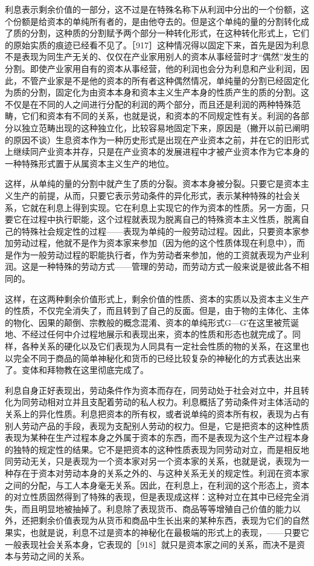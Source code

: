 利息表示剩余价值的一部分，这不过是在特殊名称下从利润中分出的一个份额，这个份额是给资本的单纯所有者的，是由他夺去的。但是这个单纯的量的分割转化成了质的分割，这种质的分割赋予两个部分一种转化形式，在这种转化形式上，它们的原始实质的痕迹已经看不见了。［917］这种情况得以固定下来，首先是因为利息不是表现为同生产无关的、仅仅在产业家用别人的资本从事经营时才“偶然”发生的分割。即使产业家用自有的资本从事经营，他的利润也会分为利息和产业利润，因此，不管产业家是不是他的资本的所有者这种偶然情况，单纯量的分割已经固定化为质的分割，固定化为由资本本身和资本主义生产本身的性质产生的质的分割。这不仅是在不同的人之间进行分配的利润的两个部分，而且还是利润的两种特殊范畴，它们和资本有不同的关系，也就是说，和资本的不同规定性有关。利润的各部分以独立范畴出现的这种独立化，比较容易地固定下来，原因是（撇开以前已阐明的原因不谈）生息资本作为一种历史形式是出现在产业资本之前，并在它的旧形式上继续同产业资本并存，只是在产业资本的发展进程中才被产业资本作为它本身的一种特殊形式置于从属资本主义生产的地位。

这样，从单纯的量的分割中就产生了质的分裂。资本本身被分裂。只要它是资本主义生产的前提，从而，只要它表示劳动条件的异化形式，表示某种特殊的社会关系，它就在利息上得到实现。它在利息上实现它的作为资本的性质。另一方面，只要它在过程中执行职能，这个过程就表现为脱离自己的特殊资本主义性质，脱离自己的特殊社会规定性的过程——表现为单纯的一般劳动过程。因此，只要资本家参加劳动过程，他就不是作为资本家来参加（因为他的这个性质体现在利息中），而是作为一般劳动过程的职能执行者，作为劳动者来参加，他的工资就表现为产业利润。这是一种特殊的劳动方式——管理的劳动，而劳动方式一般来说是彼此各不相同的。

这样，在这两种剩余价值形式上，剩余价值的性质、资本的实质以及资本主义生产的性质，不仅完全消失了，而且转到了自己的反面。但是，由于物的主体化、主体的物化、因果的颠倒、宗教般的概念混淆、资本的单纯形式G—G′在这里被荒诞地、不经过任何中介过程地展示和表现出来，资本的性质和形态也就完成了。同样，各种关系的硬化以及它们表现为人同具有一定社会性质的物的关系，在这里也以完全不同于商品的简单神秘化和货币的已经比较复杂的神秘化的方式表达出来了。变体和拜物教在这里彻底完成了。

利息自身正好表现出，劳动条件作为资本而存在，同劳动处于社会对立中，并且转化为同劳动相对立并且支配着劳动的私人权力。利息概括了劳动条件对主体活动的关系上的异化性质。利息把资本的所有权，或者说单纯的资本所有权，表现为占有别人劳动产品的手段，表现为支配别人劳动的权力。但是，它是把资本的这种性质表现为某种在生产过程本身之外属于资本的东西，而不是表现为这个生产过程本身的独特的规定性的结果。它不是把资本的这种性质表现为同劳动对立，而是相反地同劳动无关，只是表现为一个资本家对另一个资本家的关系，也就是说，表现为一种存在于资本对劳动本身的关系之外的、与这种关系无关的规定性。利润在资本家之间的分配，与工人本身毫无关系。因此，在利息上，在利润的这个形态上，资本的对立性质固然得到了特殊的表现，但是表现成这样：这种对立在其中已经完全消失，而且明显地被抽掉了。利息除了表现货币、商品等等增殖自己价值的能力以外，还把剩余价值表现为从货币和商品中生长出来的某种东西，表现为它们的自然果实，也就是说，利息不过是资本的神秘化在最极端的形式上的表现，——只要它一般表现社会关系本身，它表现的［918］就只是资本家之间的关系，而决不是资本与劳动之间的关系。


